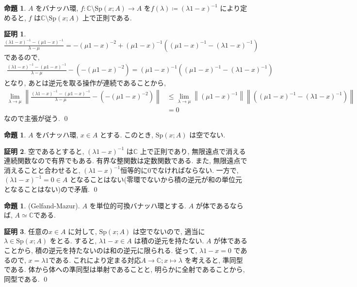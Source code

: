 \documentclass[10pt, fleqn, label-section=none]{bxjsarticle}
\theoremstyle{definition}
\newtheorem{prop}[dfn]{命題}
\newtheorem*{pf*}{証明}
\newcommand{\norm}[1]{\left\|#1\right\|}
\renewcommand{\;}{\, ; \,}
\begin{document}
\begin{prop}$A$ をバナッハ環, $f : \mathbb C \setminus \textrm{Sp}(x ; A) \rightarrow A$ を$f(\lambda) \coloneqq (\lambda 1 - x)^{-1} $  により定めると, $f$ は$ \mathbb C \setminus \textrm{Sp}(x ; A)$ 上で正則である. 
\end{prop}
\begin{pf*}
$ \frac{ (\lambda 1 - x)^{-1} - (\mu1 - x)^{-1}   }{\lambda - \mu} = - (\mu1 - x)^{-2} + (\mu1 - x)^{-1}  ((\mu1 - x)^{-1}  - (\lambda 1 - x)^{-1} ) $ であるので, 
\begin{align*} \frac{ (\lambda 1 - x)^{-1} - (\mu1 - x)^{-1}   }{\lambda - \mu} - ( - (\mu1 - x)^{-2} ) =  (\mu1 - x)^{-1}  ((\mu1 - x)^{-1}  - (\lambda 1 - x)^{-1} ) \end{align*}
となり, あとは逆元を取る操作が連続であることから,
\begin{align*} \lim_{\lambda \rightarrow \mu }  \norm {\frac{ (\lambda 1 - x)^{-1} - (\mu1 - x)^{-1}   }{\lambda - \mu} - ( - (\mu1 - x)^{-2} )  } &\leq \lim_{\lambda \rightarrow \mu } \norm{ (\mu1 - x)^{-1} } \norm{ ((\mu1 - x)^{-1}  - (\lambda 1 - x)^{-1} ) }  \\& = 0 \end{align*} 
なので主張が従う. 
\qed
\end{pf*}



\begin{prop}
$A$ をバナッハ環, $x \in A$ とする. このとき, 
$\textrm{Sp}(x ; A)$ は空でない.  
\end{prop}
\begin{pf*}
空であるとすると, $(\lambda 1 - x) ^{-1}$ は$\mathbb C$ 上で正則であり, 無限遠点で消える連続関数なので有界でもある. 有界な整関数は定数関数である. また, 無限遠点で消えることと合わせると, $(\lambda 1 - x) ^{-1}$恒等的に$0$でなければならない. 一方で, 
$(\lambda 1 - x) ^{-1} = 0 \in A$ となることはない(零環でないから積の逆元が和の単位元となることはない)ので矛盾. 
\qed
\end{pf*}

\begin{prop}(Gelfand-Mazur). 
$A$ を単位的可換バナッハ環とする. $A$ が体であるならば, $A \simeq \mathbb C$である. 
\end{prop}
\begin{pf*}
任意の$x \in A$ に対して,  $\textrm{Sp} (x ;A)$ は空でないので, 適当に$\lambda \in \textrm{Sp} (x ;A)$  をとる. すると, $\lambda 1 - x  \in A$ は積の逆元を持たない. $A$ が体であることから, 積の逆元を持たないのは和の逆元に限られる. 従って, $\lambda 1 - x = 0$ であるので, $x = \lambda 1$である. これにより定まる対応$A \rightarrow \mathbb C; x \mapsto \lambda$ を考えると, 準同型である. 体から体への準同型は単射であることと, 明らかに全射であることから, 同型である. 
\qed
\end{pf*}
\end{document}
